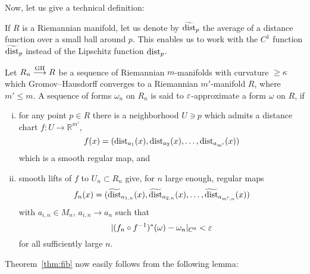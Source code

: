 \documentclass{amsart}
\begin{document}
Now, let us give a technical definition:


If $R$ is a Riemannian manifold,
let us denote by $\widetilde{\operatorname{\rm dist}}_p$ the average of a distance function
over a small ball around $p$.
This enables us
to work with the $C^{1}$  function $\widetilde{\operatorname{\rm dist}}_p$
instead of the Lipschitz function $\operatorname{\rm dist}_p$.

\begin{defn}\label{def:close}
Let $R_n\GHto R$ be a sequence of Riemannian $m$-manifolds
with curvature $\ge \kappa$ which Gromov--Hausdorff converges
to a Riemannian $m'$-manifold $R$, where $m'\le m$.
A sequence of forms $\omega_n$ on $R_n$ is said to
$\varepsilon$-approximate a form $\omega$ on $R$,
if
\begin{enumerate}[(i)]
\item
for any point $p\in R$ there is a neighborhood $U\ni p$
which admits a distance chart $f\colon U\to \mathbb{R}^{m'}$,
$$f(x)=(\operatorname{\rm dist}_{a_1}(x),\operatorname{\rm dist}_{a_2}(x),\dots,\operatorname{\rm dist}_{a_{m'}}(x))$$
which is a smooth regular map,
and

\item
smooth lifts of $f$ to $U_n\subset R_n$
give, for $n$ large enough, regular maps
$$f_n(x)=(\widetilde{\operatorname{\rm dist}}_{a_{1,n}}(x),\widetilde{\operatorname{\rm dist}}_{a_{2,n}}(x),\dots,
\widetilde{\operatorname{\rm dist}}_{a_{m',n}}(x))$$
with $a_{i,n}\in M_n$, $a_{i,n}\to a_{n}$
such that
$$|(f_n\circ f^{-1})^*(\omega)-\omega_n|_{C^{0}}<\varepsilon$$
for all sufficiently large $n$.

\end{enumerate}

\end{defn}

Theorem~\ref{thm:fib} now easily follows from the following lemma:
\end{document}
